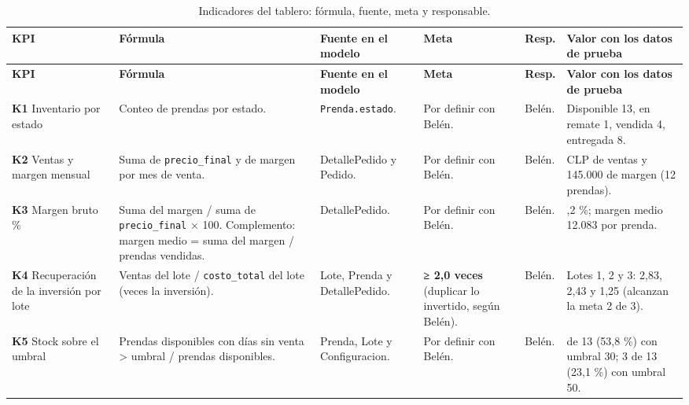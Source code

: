 \documentclass[11pt,letterpaper]{article}
\begin{document}
{\scriptsize
\setlength{\tabcolsep}{3pt}\renewcommand{\arraystretch}{1.15}
\begin{longtable}{>{\raggedright\arraybackslash}p{}>{\raggedright\arraybackslash}p{}>{\raggedright\arraybackslash}p{}>{\raggedright\arraybackslash}p{}>{\raggedright\arraybackslash}p{}>{\raggedright\arraybackslash}p{}}
\caption{Indicadores del tablero: fórmula, fuente, meta y responsable.}\\
\hline
\rowcolor[HTML]{D9EAF7}\textbf{\textbf{KPI}} & \textbf{\textbf{Fórmula}} & \textbf{\textbf{Fuente en el modelo}} & \textbf{\textbf{Meta}} & \textbf{\textbf{Resp.}} & \textbf{\textbf{Valor con los datos de prueba}} \\
\hline
\endfirsthead
\hline
\rowcolor[HTML]{D9EAF7}\textbf{\textbf{KPI}} & \textbf{\textbf{Fórmula}} & \textbf{\textbf{Fuente en el modelo}} & \textbf{\textbf{Meta}} & \textbf{\textbf{Resp.}} & \textbf{\textbf{Valor con los datos de prueba}} \\
\hline
\endhead
\textbf{K1} Inventario por estado & Conteo de prendas por estado. & \texttt{Prenda.estado}. & Por definir con Belén. & Belén. & Disponible 13, en remate 1, vendida 4, entregada 8. \\
\hline
\textbf{K2} Ventas y margen mensual & Suma de \texttt{precio\_\allowbreak{}final} y de margen por mes de venta. & DetallePedido y Pedido. & Por definir con Belén. & Belén. & 183.000 CLP de ventas y 145.000 de margen (12 prendas). \\
\hline
\textbf{K3} Margen bruto \% & Suma del margen / suma de \texttt{precio\_\allowbreak{}final} × 100. Complemento: margen medio = suma del margen / prendas vendidas. & DetallePedido. & Por definir con Belén. & Belén. & 79,2 \%; margen medio 12.083 por prenda. \\
\hline
\textbf{K4} Recuperación de la inversión por lote & Ventas del lote / \texttt{costo\_\allowbreak{}total} del lote (veces la inversión). & Lote, Prenda y DetallePedido. & \textbf{≥ 2,0 veces} (duplicar lo invertido, según Belén). & Belén. & Lotes 1, 2 y 3: 2,83, 2,43 y 1,25 (alcanzan la meta 2 de 3). \\
\hline
\textbf{K5} Stock sobre el umbral & Prendas disponibles con días sin venta > umbral / prendas disponibles. & Prenda, Lote y Configuracion. & Por definir con Belén. & Belén. & 7 de 13 (53,8 \%) con umbral 30; 3 de 13 (23,1 \%) con umbral 50. \\
\hline
\end{longtable}
}
\end{document}
